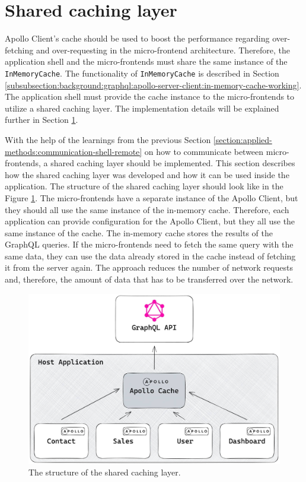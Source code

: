 \section{Shared caching layer}\label{section:applied-methods:shared-caching-layer}

Apollo Client's cache should be used to boost the performance regarding over-fetching and over-requesting in the micro-frontend architecture. Therefore, the application shell and the micro-frontends must share the same instance of the \texttt{InMemoryCache}. The functionality of \texttt{InMemoryCache} is described in Section \ref{subsubsection:background:graphql:apollo-server-client:in-memory-cache-working}. The application shell must provide the cache instance to the micro-frontends to utilize a shared caching layer. The implementation details will be explained further in Section \ref{section:applied-methods:shared-caching-layer}. 


\noindent With the help of the learnings from the previous Section \ref{section:applied-methods:communication-shell-remote} on how to communicate between micro-frontends, a shared caching layer should be implemented. This section describes how the shared caching layer was developed and how it can be used inside the application. The structure of the shared caching layer should look like in the Figure \ref{fig:applied-methods:structure-shared-caching-layer}. The micro-frontends have a separate instance of the Apollo Client, but they should all use the same instance of the in-memory cache. Therefore, each application can provide configuration for the Apollo Client, but they all use the same instance of the cache. The in-memory cache stores the results of the GraphQL queries. If the micro-frontends need to fetch the same query with the same data, they can use the data already stored in the cache instead of fetching it from the server again. The approach reduces the number of network requests and, therefore, the amount of data that has to be transferred over the network. 

\ifshowImages
  \begin{figure}[H]
  \centering
  \includegraphics[width=0.8\linewidth]{images/applied-methods/shared-caching-layer/shared-caching-layer.jpg}
  \caption{The structure of the shared caching layer.}\label{fig:applied-methods:structure-shared-caching-layer}
  \end{figure}
\fi

